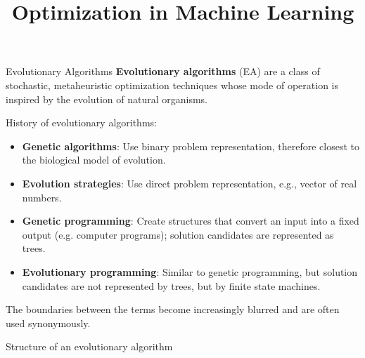 \documentclass[11pt,compress,t,notes=noshow, xcolor=table]{beamer}
\title{Optimization in Machine Learning}
\begin{document}

\begin{framev}{Evolutionary Algorithms}
\textbf{Evolutionary algorithms} (EA) are a class of stochastic, metaheuristic optimization techniques whose mode of operation is inspired by the evolution of natural organisms.
\spacer
{\footnotesize
History of evolutionary algorithms:
\begin{itemize}
\item \textbf{Genetic algorithms}: Use binary problem representation, therefore closest to the biological model of evolution.
\item \textbf{Evolution strategies}: Use direct problem representation, e.g., vector of real numbers.
\item \textbf{Genetic programming}: Create structures that convert an input into a fixed output (e.g. computer programs); solution candidates are represented as trees.
\item \textbf{Evolutionary programming}: Similar to genetic programming, but solution candidates are not represented by trees, but by finite state machines.
\end{itemize}
The boundaries between the terms become increasingly blurred and are often used synonymously.
}
\end{framev}


\begin{framev}{Structure of an evolutionary algorithm}
\end{framev}
\end{document}
